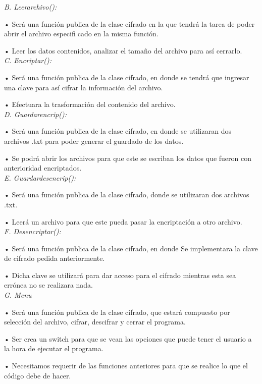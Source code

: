 \documentclass[9pt,24pt,twocolumn]{article}
\begin{document}
\textit{B. Leerarchivo():}

{• Será una función publica de la clase cifrado en la que tendrá la tarea de poder abrir el archivo especificado en la misma función.}

{• Leer los datos contenidos, analizar el tamaño del archivo para así cerrarlo.}
\\

\textit{C. Encriptar():}

{• Será una función publica de la clase cifrado, en donde se tendrá que ingresar una clave para así cifrar la información del archivo.}

{• Efectuara la trasformación del contenido del archivo.}
\\

\textit{D. Guardarencrip():}

{• Será una función publica de la clase cifrado, en donde se utilizaran dos archivos .txt para poder generar el guardado de los datos.}

{• Se podrá abrir los archivos para que este se escriban los datos que fueron con anterioridad encriptados.}
\\

\textit{E. Guardardesencrip():}

{• Será una función publica de la clase cifrado, donde se utilizaran dos archivos .txt.}

{• Leerá un archivo para que este pueda pasar la encriptación a otro archivo.}
\\

\textit{F. Desencriptar():}

{• Será una función publica de la clase cifrado, en donde Se implementara la clave de cifrado pedida anteriormente.}

{• Dicha clave se utilizará para dar acceso para el cifrado mientras esta sea errónea no se realizara nada.}
\\

\textit{G. Menu}

{• Será una función publica de la clase cifrado, que estará compuesto por selección del archivo, cifrar, descifrar y cerrar el programa.}

{• Ser crea un switch para que se vean las opciones que puede tener el usuario a la hora de ejecutar el programa.}

{• Necesitamos requerir de las funciones anteriores para que se realice lo que el código debe de hacer.}
\\
\end{document}
